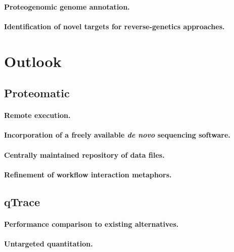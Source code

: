 \paragraph{Proteogenomic genome annotation.}

\paragraph{Identification of novel targets for reverse-genetics approaches.}

\section{Outlook}

\subsection{Proteomatic}

\paragraph{Remote execution.}

\paragraph{Incorporation of a freely available {\em de novo} sequencing software.}

\paragraph{Centrally maintained repository of data files.}

\paragraph{Refinement of workflow interaction metaphors.}

\subsection{qTrace}

\paragraph{Performance comparison to existing alternatives.}

\paragraph{Untargeted quantitation.}

